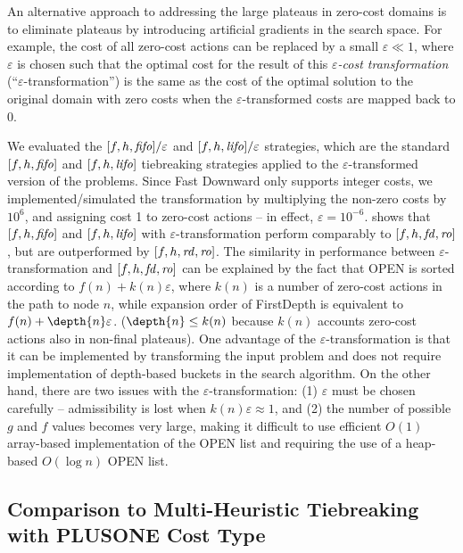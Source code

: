 An alternative approach to addressing the large plateaus in zero-cost domains is
to eliminate plateaus by introducing artificial gradients in the search space.
For example, the cost of all zero-cost actions can be replaced by a small $\varepsilon\ll 1$, where 
$\varepsilon$ is chosen such that the optimal cost for the result of  this \emph{$\varepsilon$-cost transformation} (``$\varepsilon$-transformation'') is the same as the cost of the optimal solution to the original domain with zero costs when the $\varepsilon$-transformed costs are mapped back to 0.

We evaluated the $[f,h,{\mbox{\textit{fifo}}}]/\varepsilon$ and $[f,h,{\mbox{\textit{lifo}}}]/\varepsilon$ strategies, which are the standard $[f,h,{\mbox{\textit{fifo}}}]$ and $[f,h,{\mbox{\textit{lifo}}}]$ tiebreaking strategies applied to  the $\varepsilon$-transformed version of the problems.
Since Fast Downward  only supports integer costs, we implemented/simulated the transformation by multiplying the non-zero costs by $10^6$, and assigning cost 1 to zero-cost actions -- in effect,  $\varepsilon=10^{-6}$.
 shows that $[f,h,{\mbox{\textit{fifo}}}]$ and $[f,h,{\mbox{\textit{lifo}}}]$ with $\varepsilon$-transformation
 perform comparably to $[f,h,{\mbox{\textit{fd}}},{\mbox{\textit{ro}}}]$, but are outperformed by $[f,h,{\mbox{\textit{rd}}},{\mbox{\textit{ro}}}]$.
% 
The similarity in performance between $\varepsilon$-transformation and $[f,h,{\mbox{\textit{fd}}},{\mbox{\textit{ro}}}]$ can be explained by the fact that  OPEN is sorted according to  $f(n)+k(n)\varepsilon$,
where $k(n)$ is a number of zero-cost actions in the path to node $n$,
while expansion order of FirstDepth is equivalent to $f(n)+\depth{n}\varepsilon$.
($\depth{n}\leq k(n)$ because $k(n)$ accounts zero-cost actions also in non-final plateaus).
% 
One advantage of the $\varepsilon$-transformation is that it can be implemented by transforming the input problem and does not require implementation of depth-based buckets in the search algorithm.
On the other hand, there are two issues with the $\varepsilon$-transformation:
(1) $\varepsilon$ must be chosen carefully -- admissibility is lost  when $k(n)\varepsilon\approx 1$, and
(2) the number of possible $g$ and $f$ values becomes very large, making it difficult to use efficient $O(1)$ array-based implementation of the OPEN list and requiring the use of a heap-based $O(\log n)$ OPEN list.

\subsection{Comparison to Multi-Heuristic Tiebreaking with PLUSONE Cost Type}



